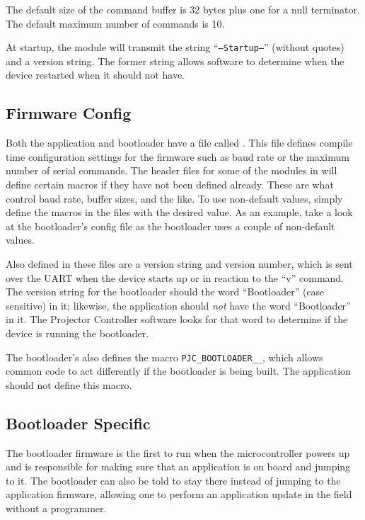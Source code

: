 \documentclass{article}
\begin{document}
The default size of the command buffer is 32 bytes plus one for a null terminator.  The default
maximum number of commands is 10.

At startup, the module will transmit the string ``\texttt{---Startup---}'' (without quotes) and a
version string.  The former string allows software to determine when the device restarted when it
should not have.

\subsection{Firmware Config} \label{ssec:FWConfig}
Both the application and bootloader have a file called .  This file defines
compile time configuration settings for the firmware such as baud rate or the maximum number of
serial commands.  The header files for some of the modules in  will define
certain macros if they have not been defined already.  These are what control baud rate, buffer
sizes, and the like.  To use non-default values, simply define the macros in the 
files with the desired value.  As an example, take a look at the bootloader's config file
 as the bootloader uses a couple of non-default values.

Also defined in these files are a version string and version number, which is
sent over the UART when the device starts up or in reaction to the ``v'' command.  The version
string for the bootloader should the word ``Bootloader'' (case sensitive) in it; likewise, the
application should \emph{not} have the word ``Bootloader'' in it.  The Projector Controller software
looks for that word to determine if the device is running the bootloader.

The bootloader's  also defines the macro \texttt{PJC\_BOOTLOADER\_\_}, which allows
common code to act differently if the bootloader is being built.  The application should not define
this macro.

\subsection{Bootloader Specific} \label{ssec:FWBootloader}
The bootloader firmware is the first to run when the microcontroller powers up and is responsible
for making sure that an application is on board and jumping to it.  The bootloader can also be told
to stay there instead of jumping to the application firmware, allowing one to perform an application
update in the field without a programmer.
\end{document}
